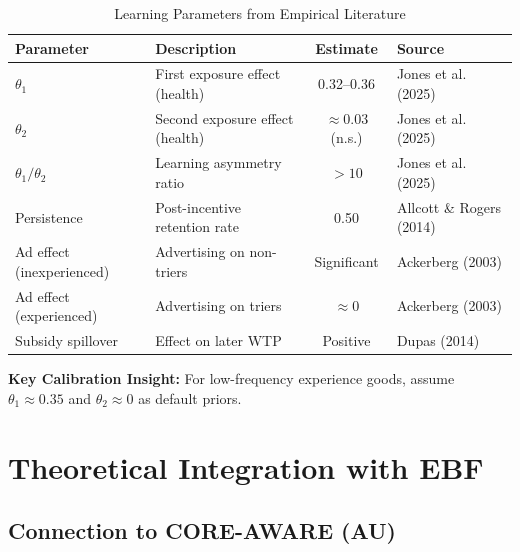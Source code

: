 \documentclass[11pt, a4paper]{article}
\begin{document}
\begin{table}[htbp]
\centering
\caption{Learning Parameters from Empirical Literature}
\label{tab:lrn-parameters}
\renewcommand{\arraystretch}{1.4}
\begin{tabular}{@{}llcl@{}}
\toprule
\textbf{Parameter} & \textbf{Description} & \textbf{Estimate} & \textbf{Source} \\
\midrule
$\theta_1$ & First exposure effect (health) & 0.32--0.36 & Jones et al. (2025) \\
$\theta_2$ & Second exposure effect (health) & $\approx 0.03$ (n.s.) & Jones et al. (2025) \\
$\theta_1/\theta_2$ & Learning asymmetry ratio & $> 10$ & Jones et al. (2025) \\
Persistence & Post-incentive retention rate & 0.50 & Allcott \& Rogers (2014) \\
Ad effect (inexperienced) & Advertising on non-triers & Significant & Ackerberg (2003) \\
Ad effect (experienced) & Advertising on triers & $\approx 0$ & Ackerberg (2003) \\
Subsidy spillover & Effect on later WTP & Positive & Dupas (2014) \\
\bottomrule
\end{tabular}
\end{table}

\textbf{Key Calibration Insight:} For low-frequency experience goods, assume $\theta_1 \approx 0.35$ and $\theta_2 \approx 0$ as default priors.


\section{Theoretical Integration with EBF}
\label{sec:lrn-integration}

\subsection{Connection to CORE-AWARE (AU)}
\end{document}
